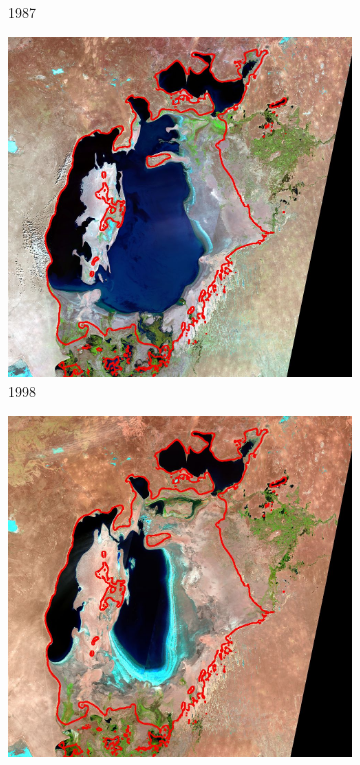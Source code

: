 \documentclass[12pt,a4paper]{article}
\begin{document}
\begin{figure}
\begin{subfigure}[b]{0.19\textwidth}
        \caption{1987}
    \end{subfigure}
    \begin{subfigure}[b]{0.19\textwidth}
        \centering
        \includegraphics[width=\textwidth]{../img/1998o.jpg}
        \caption{1998}
    \end{subfigure}
    \begin{subfigure}[b]{0.19\textwidth}
        \centering
        \includegraphics[width=\textwidth]{../img/2006o.jpg}

\end{subfigure}
\end{figure}
\end{document}
